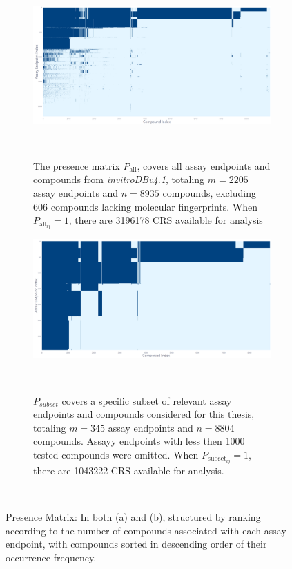\begin{figure}[htbp]
    \centering
    \begin{subfigure}[b]{0.48\textwidth}
        \centering
        \includegraphics[width=\textwidth]{figures/presence_matrix_all.png}
        \caption{The presence matrix $P_{\text{all}}$, covers all assay endpoints and compounds from \emph{invitroDBv4.1}, totaling $m = \num{2205}$ assay endpoints and $n = \num{8935}$ compounds, excluding 606 compounds lacking molecular fingerprints. When $P_{\text{all}_{ij}} = 1$, there are \num{3196178} CRS available for analysis}
    ~\label{fig:presence_matrix_all}
    \end{subfigure}
    \hfill
    \begin{subfigure}[b]{0.48\textwidth}
        \centering
        \includegraphics[width=\textwidth]{figures/presence_matrix_subset.png}
        \caption{$P_{subset}$ covers a specific subset of relevant assay endpoints and compounds considered for this thesis, totaling $m = \num{345}$ assay endpoints and $n = \num{8804}$ compounds. Assayy endpoints with less then 1000 tested compounds were omitted. When $P_{\text{subset}_{ij}} = 1$, there are \num{1043222} CRS available for analysis.}
        ~\label{fig:presence_matrix_subset}
    \end{subfigure}
    \caption{Presence Matrix: In both (a) and (b), structured by ranking according to the number of compounds associated with each assay endpoint, with compounds sorted in descending order
    of their occurrence frequency.}
    ~\label{fig:presence_matrix}
\end{figure}

